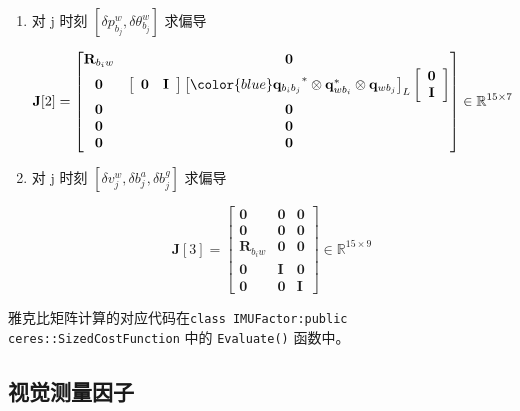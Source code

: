 \documentclass[12pt,a4paper]{article}
\begin{document}
\begin{enumerate}
\begin{enumerate}
\item 对 {\color{blue}j 时刻 $[\delta p^{w}_{b_{j}},\delta \theta ^{w}_{b_{j}}]$} 求偏导

\begin{equation}
\mathbf{J}[2]=
\begin{bmatrix}
\mathbf{R}_{b_{i} w} & \mathbf{0} \\
\mathbf{0} & \left[\begin{array}{ll}{\mathbf{0}} & {\mathbf{I}}\end{array}\right]\left[{\color{blue}\mathbf{q}_{b_{i} b_{j}}}^{*} \otimes \mathbf{q}_{w b_{i}}^{*} \otimes \mathbf{q}_{w b_{j}}\right]_{L}\left[\begin{array}{c}{\mathbf{0}} \\ {\mathbf{I}}\end{array}\right] \\
\mathbf{0} & \mathbf{0} \\
\mathbf{0} & \mathbf{0}  \\
\mathbf{0} & \mathbf{0}   
\end{bmatrix}
\in \mathbb{R}^{15 \times 7}
\end{equation}

\item 对 {\color{blue}j 时刻 $[\delta v^{w}_{j},\delta b^a_{j},\delta b^g_{j}]$} 求偏导

\begin{equation}
\mathbf{J}[3]=
\begin{bmatrix}
\mathbf{0} & \mathbf{0} & \mathbf{0} \\
\mathbf{0} & \mathbf{0} & \mathbf{0} \\
\mathbf{R}_{b_{i} w} & \mathbf{0} & \mathbf{0} \\
\mathbf{0} & \mathbf{I} & \mathbf{0} \\
\mathbf{0} & \mathbf{0} & \mathbf{I}
\end{bmatrix}
\in \mathbb{R}^{15 \times 9}
\end{equation}

\end{enumerate}

雅克比矩阵计算的对应代码在\verb|class IMUFactor:public ceres::SizedCostFunction| 中的 \verb|Evaluate()| 函数中。

\end{enumerate}

\subsection{视觉测量因子}
\end{document}

